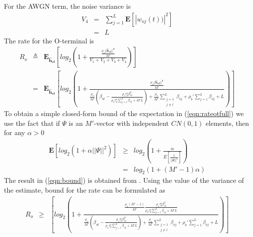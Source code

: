 \documentclass[10pt, a4paper, twoside,fleqn]{article}
\begin{document}
For the AWGN term, the noise variance is 
\begin{eqnarray}
	V_4 &=& \sum\limits_{j=1}^{L}\pmb{E}[|w_{oj}(t))|^2] \nonumber \\
            &=& L
\end{eqnarray}
The rate for the O-terminal is
\begin{eqnarray}\label{eqn:rateotfull}
	R_o &\triangleq& \pmb{E_{\hat h_{el}}}\left[log_2\left(1+\frac{\frac{\rho_o||\pmb{\hat h_{el}||^2}}{M'}}{V_1+V_2+V_3+V_4}\right) \right] \nonumber \\
            &=&  \pmb{E_{\hat h_{el}}}\left[log_2\left(1+\frac{\frac{\rho_o||\pmb{\hat h_{el}||^2}}{M'}}
								 {\frac{\rho_o}{M'}(\beta_{ol}-\frac{\rho_o\tau_p^o\beta^2_{ol}}{\rho_o\tau_p^o\sum_{j=1}^{L}\beta_{oj}+M'L})        
								  + \frac{\rho_o}{M'} \sum_{\substack{j=1 \\ j\neq l}}^{L} \beta_{oj} 
								  +\rho_b'\sum_{j=1}^{L}\beta_{oj}
								  +L}\right) \right]	
\end{eqnarray}
To obtain a simple closed-form bound of the expectation in (\ref{eqn:rateotfull}) we use the fact that if $\Psi$ is an $M'$-vector with independent $CN(0,1)$ elements, then for any $\alpha>0$
\begin{eqnarray}\label{eqn:bound}
	\pmb{E}[log_2(1+\alpha||\Psi||^2)] &\geq& log_2\left(1+\frac{\alpha}{E[\frac{1}{||\Psi||^2}]}\right) \nonumber \\
                                              &=&  log_2(1+(M'-1)\alpha)
\end{eqnarray}
The result in (\ref{eqn:bound}) is obtained from \cite{bib:dtsysBook}. Using the value of the variance of the estimate, bound for the rate can be formulated as
\begin{eqnarray}
	R_o &\geq& \left[log_2\left(1+\frac{\frac{\rho_o(M'-1)}{M'}\frac{\rho_o\tau_p^o\beta^2_{ol}}{\rho_o\tau_p^o\sum_{j=1}^{L}\beta_{oj}+M'L}}
								 {\frac{\rho_o}{M'}(\beta_{ol}-\frac{\rho_o\tau_p^o\beta^2_{ol}}{\rho_o\tau_p^o\sum_{j=1}^{L}\beta_{oj}+M'L})        
								  + \frac{\rho_o}{M'} \sum_{\substack{j=1 \\ j\neq l}}^{L} \beta_{oj} 
								  +\rho_b'\sum_{j=1}^{L}\beta_{oj}
								  +L}\right) \right]	
\end{eqnarray}
\end{document}
